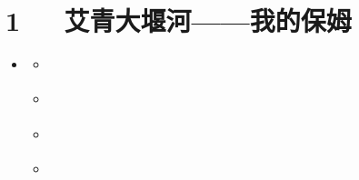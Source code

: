 \documentclass[letterpaper,12pt,english]{sphinxmanual}
\begin{document}
\chapter{1   艾青\sphinxhyphen{}大堰河——我的保姆}
\label{\detokenize{p01_u6563_u6587/_u827e_u9752-_u5927_u5830_u6cb3_u2014_u2014_u6211_u7684_u4fdd_u59c6:id1}}\label{\detokenize{p01_u6563_u6587/_u827e_u9752-_u5927_u5830_u6cb3_u2014_u2014_u6211_u7684_u4fdd_u59c6::doc}}
\begin{sphinxShadowBox}
\begin{itemize}
\item {} 
\label{\detokenize{p01_u6563_u6587/_u827e_u9752-_u5927_u5830_u6cb3_u2014_u2014_u6211_u7684_u4fdd_u59c6:id7}}{\hyperref[\detokenize{p01_u6563_u6587/_u827e_u9752-_u5927_u5830_u6cb3_u2014_u2014_u6211_u7684_u4fdd_u59c6:id1}]{}}
\begin{itemize}
\item {} 
\label{\detokenize{p01_u6563_u6587/_u827e_u9752-_u5927_u5830_u6cb3_u2014_u2014_u6211_u7684_u4fdd_u59c6:id8}}{\hyperref[\detokenize{p01_u6563_u6587/_u827e_u9752-_u5927_u5830_u6cb3_u2014_u2014_u6211_u7684_u4fdd_u59c6:id3}]{}}

\item {} 
\label{\detokenize{p01_u6563_u6587/_u827e_u9752-_u5927_u5830_u6cb3_u2014_u2014_u6211_u7684_u4fdd_u59c6:id9}}{\hyperref[\detokenize{p01_u6563_u6587/_u827e_u9752-_u5927_u5830_u6cb3_u2014_u2014_u6211_u7684_u4fdd_u59c6:id4}]{}}

\item {} 
\label{\detokenize{p01_u6563_u6587/_u827e_u9752-_u5927_u5830_u6cb3_u2014_u2014_u6211_u7684_u4fdd_u59c6:id10}}{\hyperref[\detokenize{p01_u6563_u6587/_u827e_u9752-_u5927_u5830_u6cb3_u2014_u2014_u6211_u7684_u4fdd_u59c6:id5}]{}}

\item {} 
\label{\detokenize{p01_u6563_u6587/_u827e_u9752-_u5927_u5830_u6cb3_u2014_u2014_u6211_u7684_u4fdd_u59c6:id11}}{\hyperref[\detokenize{p01_u6563_u6587/_u827e_u9752-_u5927_u5830_u6cb3_u2014_u2014_u6211_u7684_u4fdd_u59c6:id6}]{}}

\end{itemize}

\end{itemize}
\end{sphinxShadowBox}
\end{document}
